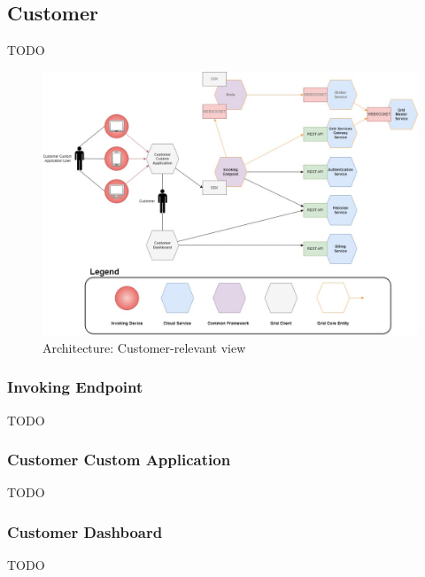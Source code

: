\subsection{Customer}
TODO
\begin{figure}[!ht]
    \centering
    \includegraphics[width=\linewidth]{document/chapters/chapter_6/images/architecture_customer.jpg}
    \caption{Architecture: Customer-relevant view}
    \label{fig:architecture_customer}
\end{figure}

\subsubsection{Invoking Endpoint}
TODO

\subsubsection{Customer Custom Application}
TODO

\subsubsection{Customer Dashboard}
TODO
